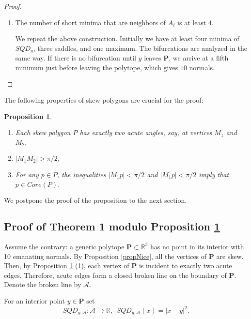 \documentclass[12pt]{amsart}
\newtheorem{prop}{Proposition}
\newtheorem*{main lemma}{The main lemma}
\begin{document}
\begin{proof}
\begin{enumerate}
\item The number of short minima that are neighbors of $A_i$ is at least $4$. 

 We repeat the above construction. Initially we have at least four minima of $SQD_y$, three saddles, and  one  maximum.  The bifurcations are analyzed in the same way. If there is no bifurcation until $y$ leaves $\mathbf{P}$, we arrive at a fifth minimum just before leaving the polytope, which gives $10$ normals.



    
\end{enumerate}

    
\end{proof}



The following properties   of skew polygons are crucial for the proof:



\begin{prop}\label{propSkew}
\begin{enumerate}
    \item  Each skew polygon $P$ has exactly two acute angles, say, at vertices $M_1$ and $M_2$,
    \item $|M_1M_2|>\pi/2$,
    \item For any $p\in P$, the inequalities $|M_1p|<\pi/2$ and $|M_1p|<\pi/2$ imply that $p \in Core(P)$. 
\end{enumerate}
\end{prop}

We postpone the proof of the proposition to the next section.

\subsection*{Proof of Theorem 1 modulo Proposition \ref{propSkew}}

Assume the contrary: a generic polytope $\mathbf{P}\subset \mathbb{R}^3$ has no point in its interior with 10  emanating normals.
By Proposition \ref{propNice}, all the vertices of $\mathbf{P}$ are skew. Then, by Proposition \ref{propSkew} (1), each vertex of $\mathbf{P}$ is incident to exactly two acute edges. Therefore, acute edges form a closed broken line on the boundary of $\mathbf{P}$. Denote the broken line by $\mathcal{A}$.

For an interior point $y \in \mathbf{P}$  set $$SQD_{y,\mathcal{A}}: \mathcal{A}\rightarrow \mathbb{R}, \ \ SQD_{y,\mathcal{A}} (x) = |x-y|^2.$$ 
\end{document}
